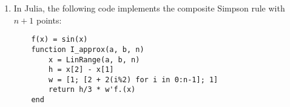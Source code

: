 \documentclass{article}
\begin{document}
\begin{enumerate}
    \item
        In Julia, the following code implements the composite Simpson rule with $n+1$ points:
        \begin{verbatim}
    f(x) = sin(x)
    function I_approx(a, b, n)
        x = LinRange(a, b, n)
        h = x[2] - x[1]
        w = [1; [2 + 2(i%2) for i in 0:n-1]; 1]
        return h/3 * w'f.(x)
    end
        \end{verbatim}
    \end{enumerate}
\end{document}
